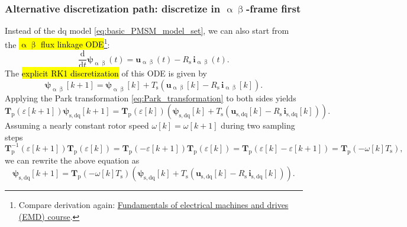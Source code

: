 \begin{frame}
    \frametitle{Alternative discretization path: discretize in $\upalpha\upbeta$-frame first}
    Instead of the $\mathrm{dq}$ model \eqref{eq:basic_PMSM_model_set}, we can also start from the \hl{$\upalpha\upbeta$ flux linkage ODE}\footnote{Compare derivation again: \href{https://github.com/IAS-Uni-Siegen/EMD_course}{Fundamentals of electrical machines and drives (EMD) course}.}:
    \begin{equation}
        \frac{\mathrm{d}}{\mathrm{d}t}\bm{\psi}_{\upalpha\upbeta}(t) = \bm{u}_{\upalpha\upbeta}(t) - R_\mathrm{s}\,\bm{i}_{\upalpha\upbeta}(t).
        \label{eq:PMSM_flux_ODE_alpha_beta}
    \end{equation}\pause
    The \hl{explicit RK1 discretization} of this ODE is given by
    \begin{equation}
        \bm{\psi}_{\upalpha\upbeta}[k+1] = \bm{\psi}_{\upalpha\upbeta}[k] + T_\mathrm{s}\left(\bm{u}_{\upalpha\upbeta}[k] - R_\mathrm{s}\,\bm{i}_{\upalpha\upbeta}[k]\right).
    \end{equation}\pause
    Applying the Park transformation \eqref{eq:Park_transformation} to both sides yields
    \begin{equation}
        \bm{T}_\mathrm{p}(\varepsilon[k+1])\bm{\psi}_{\mathrm{s,dq}}[k+1] = \bm{T}_\mathrm{p}(\varepsilon[k])\left(\bm{\psi}_\mathrm{s,dq}[k] + T_\mathrm{s}\left(\bm{u}_\mathrm{s,dq}[k] - R_\mathrm{s}\,\bm{i}_\mathrm{s,dq}[k]\right)\right).
    \end{equation}\pause
    Assuming a nearly constant rotor speed $\omega[k]=\omega[k+1]$ during two sampling steps
    $$
        \bm{T}^{-1}_\mathrm{p}(\varepsilon[k+1])\bm{T}_\mathrm{p}(\varepsilon[k])=\bm{T}_\mathrm{p}(-\varepsilon[k+1])\bm{T}_\mathrm{p}(\varepsilon[k]) = \bm{T}_\mathrm{p}(\varepsilon[k]-\varepsilon[k+1]) = \bm{T}_\mathrm{p}(-\omega[k]T_\mathrm{s}),
    $$\pause
    we can rewrite the above equation as
    \begin{equation}
        \bm{\psi}_{\mathrm{s,dq}}[k+1] = \bm{T}_\mathrm{p}(-\omega[k]T_\mathrm{s})\left(\bm{\psi}_{\mathrm{s,dq}}[k] + T_\mathrm{s}\left(\bm{u}_{\mathrm{s,dq}}[k] - R_\mathrm{s}\,\bm{i}_{\mathrm{s,dq}}[k]\right)\right).
    \end{equation}
\end{frame}

